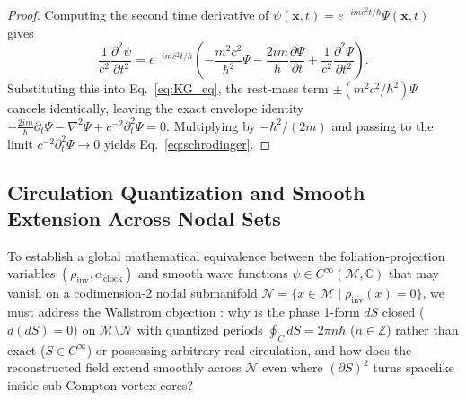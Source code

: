 \documentclass[11pt, a4paper]{article}
\theoremstyle{definition}
\begin{document}
\begin{proof}
Computing the second time derivative of $\psi(\mathbf{x}, t) = e^{-imc^2 t/\hbar}\Psi(\mathbf{x}, t)$ gives
\begin{equation}
\frac{1}{c^2}\frac{\partial^2 \psi}{\partial t^2} = e^{-imc^2 t/\hbar} \left( -\frac{m^2 c^2}{\hbar^2}\Psi - \frac{2im}{\hbar}\frac{\partial \Psi}{\partial t} + \frac{1}{c^2}\frac{\partial^2 \Psi}{\partial t^2} \right).
\end{equation}
Substituting this into Eq.~\eqref{eq:KG_eq}, the rest-mass term $\pm (m^2 c^2/\hbar^2)\Psi$ cancels identically, leaving the exact envelope identity $-\frac{2im}{\hbar}\partial_t \Psi - \nabla^2 \Psi + c^{-2}\partial_t^2 \Psi = 0$. Multiplying by $-\hbar^2/(2m)$ and passing to the limit $c^{-2}\partial_t^2\Psi \to 0$ yields Eq.~\eqref{eq:schrodinger}.
\end{proof}

\subsection{Circulation Quantization and Smooth Extension Across Nodal Sets}
\label{sec:wallstrom}

To establish a global mathematical equivalence between the foliation-projection variables $(\rho_{\text{inv}}, \alpha_{\text{clock}})$ and smooth wave functions $\psi \in C^\infty(\mathcal{M}, \mathbb{C})$ that may vanish on a codimension-2 nodal submanifold $\mathcal{N} = \{x \in \mathcal{M} \mid \rho_{\text{inv}}(x) = 0\}$, we must address the Wallstrom objection \cite{Wallstrom1994, Schmelzer2011, Khesin2026}: why is the phase 1-form $dS$ closed ($d(dS) = 0$) on $\mathcal{M}\setminus\mathcal{N}$ with quantized periods $\oint_C dS = 2\pi n \hbar$ ($n \in \mathbb{Z}$) rather than exact ($S \in C^\infty$) or possessing arbitrary real circulation, and how does the reconstructed field extend smoothly across $\mathcal{N}$ even where $(\partial S)^2$ turns spacelike inside sub-Compton vortex cores?
\end{document}
